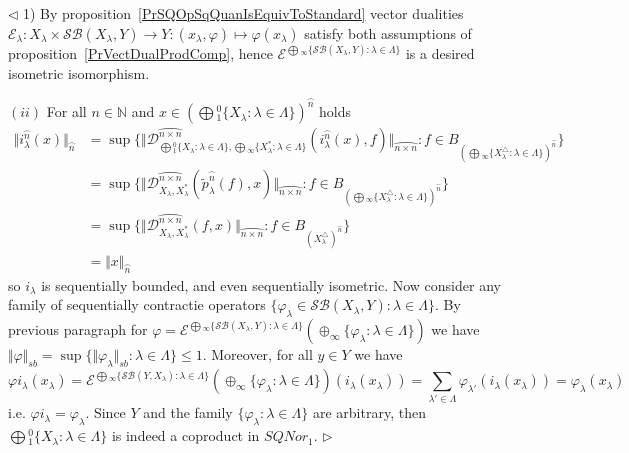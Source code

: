 \documentclass[12pt]{article}
\newenvironment{proof}{\par $\triangleleft$}{$\triangleright$}
\begin{document}
\begin{proof} 1) By proposition~\ref{PrSQOpSqQuanIsEquivToStandard} vector 
dualities 
$\mathcal{E}_\lambda
:X_\lambda\times\mathcal{SB}(X_\lambda,Y)
    \to 
Y
:(x_\lambda,\varphi)\mapsto \varphi(x_\lambda)$ satisfy both assumptions of 
proposition~\ref{PrVectDualProdComp}, 
hence $\mathcal{E}^{\bigoplus{}_\infty \{
    \mathcal{SB}(X_\lambda,Y):\lambda\in\Lambda
 \}}$ is a desired isometric isomorphism.

$(ii)$ For all $n\in\mathbb{N}$ and 
$x\in {\left(
    \bigoplus{}_1^0 \{X_\lambda:\lambda\in\Lambda
 \}\right)}^{\wideparen{n}}$ holds
$$
\begin{aligned}
\Vert 
    i_\lambda^{\wideparen{n}}(x)
\Vert_{\wideparen{n}}
&=\sup \{
    \Vert
        \mathcal{D}_{
            \bigoplus{}_1^0 \{
                X_\lambda:\lambda\in \Lambda
             \},
            \bigoplus{}_\infty \{
                X_\lambda^*:\lambda\in \Lambda
             \}}^{\wideparen{n\times n}}
            (i_\lambda^{\wideparen{n}}(x),f)
    \Vert_{\wideparen{n\times n}}
    : f\in B_{
        {(
            \bigoplus{}_\infty \{X_\lambda^\triangle:\lambda\in \Lambda \}
        )}^{\wideparen{n}}
    }
 \} \\
&=\sup \{
    \Vert
        \mathcal{D}_{X_\lambda,X_\lambda^*}^{\wideparen{n\times n}}(
            \tilde{p}_\lambda^{\wideparen{n}}(f),x
        )\Vert_{\wideparen{n\times n}}: 
        f\in B_{
            {(\bigoplus{}_\infty \{
                X_\lambda^\triangle:\lambda\in \Lambda
             \})}^{\wideparen{n}}
        }
 \} \\
&=\sup \{
    \Vert
        \mathcal{D}_{X_\lambda,X_\lambda^*}^{\wideparen{n\times n}}(f,x)
    \Vert_{\wideparen{n\times n}}
    : f\in B_{{(X_\lambda^\triangle)}^{\wideparen{n}}}
 \} \\
&=\Vert x\Vert_{\wideparen{n}}
\end{aligned}
$$ 
so $i_\lambda$ is sequentially bounded, and even sequentially isometric. 
Now consider any family of sequentially contractie operators 
$ \{\varphi_\lambda\in\mathcal{SB}(X_\lambda,Y):\lambda\in\Lambda \}$. 
By previous paragraph for  $\varphi
=\mathcal{E}^{
    \bigoplus{}_\infty \{\mathcal{SB}(X_\lambda,Y):\lambda\in\Lambda \}
}(\oplus_\infty \{\varphi_\lambda:\lambda\in\Lambda \})$ we have 
$\Vert\varphi\Vert_{sb}
=\sup \{\Vert\varphi_\lambda\Vert_{sb}:\lambda\in\Lambda \}\leq 1$. Moreover, 
for all $y\in Y$ we have
$$
\varphi i_\lambda(x_\lambda)
=\mathcal{E}^{
    \bigoplus{}_\infty \{\mathcal{SB}(Y,X_\lambda):\lambda\in\Lambda \}
}(\oplus_\infty \{\varphi_\lambda:\lambda\in\Lambda \})(i_\lambda(x_\lambda))
=\sum\limits_{\lambda'\in\Lambda}\varphi_{\lambda'}(i_\lambda(x_\lambda))
=\varphi_\lambda(x_\lambda)
$$
i.e. $\varphi i_\lambda=\varphi_\lambda$. Since $Y$ and the 
family $ \{\varphi_\lambda:\lambda\in\Lambda \}$ are arbitrary, 
then $\bigoplus{}_1^0 \{X_\lambda:\lambda\in\Lambda \}$ is indeed 
a coproduct in $SQNor_1$.
\end{proof}
\end{document}
